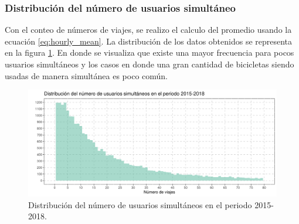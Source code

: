 \subsubsection{Distribución del número de usuarios simultáneo}

Con el conteo de números de viajes, se realizo el calculo del promedio usando la ecuación \ref{eq:hourly_mean}. La distribución de los datos obtenidos se representa en la figura \ref{fig:distribution_count_travel}. En donde se visualiza que existe una mayor frecuencia para pocos usuarios simultáneos y los casos en donde una gran cantidad de bicicletas siendo usadas de manera simultánea es poco común.

\begin{figure}[H]
    \centering
    \includegraphics[width=16cm]{Graphics/distribution_count_travel.png}
    \caption{Distribución del número de usuarios simultáneos en el periodo 2015-2018.}
    \label{fig:distribution_count_travel}
\end{figure}